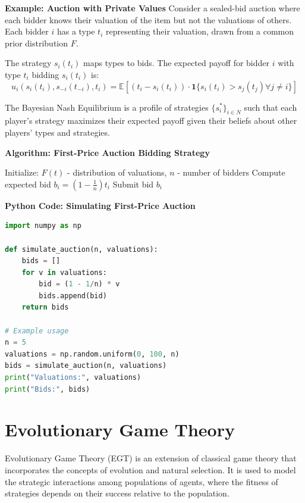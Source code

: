 \documentclass[12pt]{book} %
\begin{document}
\textbf{Example: Auction with Private Values}
Consider a sealed-bid auction where each bidder knows their valuation of the item but not the valuations of others. Each bidder $i$ has a type $t_i$ representing their valuation, drawn from a common prior distribution $F$.

The strategy $s_i(t_i)$ maps types to bids. The expected payoff for bidder $i$ with type $t_i$ bidding $s_i(t_i)$ is:
\[ u_i(s_i(t_i), s_{-i}(t_{-i}), t_i) = \mathbb{E}[(t_i - s_i(t_i)) \cdot \mathbf{1}\{s_i(t_i) > s_j(t_j) \forall j \neq i\}] \]

The Bayesian Nash Equilibrium is a profile of strategies $\{s_i^*\}_{i \in N}$ such that each player's strategy maximizes their expected payoff given their beliefs about other players' types and strategies.

\textbf{Algorithm: First-Price Auction Bidding Strategy}
\FloatBarrier
\begin{algorithm}
\caption{Bidding Strategy in a First-Price Sealed-Bid Auction}
\begin{algorithmic}[1]
\State Initialize: $F(t)$ - distribution of valuations, $n$ - number of bidders
    \State Compute expected bid $b_i = \left(1 - \frac{1}{n}\right)t_i$
    \State Submit bid $b_i$
\EndFor
\end{algorithmic}
\end{algorithm}

\FloatBarrier

\textbf{Python Code: Simulating First-Price Auction}
\begin{lstlisting}[language=Python]
import numpy as np

def simulate_auction(n, valuations):
    bids = []
    for v in valuations:
        bid = (1 - 1/n) * v
        bids.append(bid)
    return bids

# Example usage
n = 5
valuations = np.random.uniform(0, 100, n)
bids = simulate_auction(n, valuations)
print("Valuations:", valuations)
print("Bids:", bids)
\end{lstlisting}

\FloatBarrier

\section{Evolutionary Game Theory}
Evolutionary Game Theory (EGT) is an extension of classical game theory that incorporates the concepts of evolution and natural selection. It is used to model the strategic interactions among populations of agents, where the fitness of strategies depends on their success relative to the population.
\end{document}
